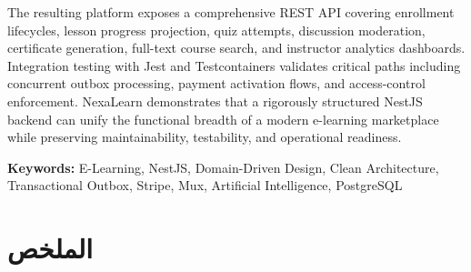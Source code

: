 The resulting platform exposes a comprehensive REST API covering enrollment lifecycles, lesson progress projection, quiz attempts, discussion moderation, certificate generation, full-text course search, and instructor analytics dashboards. Integration testing with Jest and Testcontainers validates critical paths including concurrent outbox processing, payment activation flows, and access-control enforcement. NexaLearn demonstrates that a rigorously structured NestJS backend can unify the functional breadth of a modern e-learning marketplace while preserving maintainability, testability, and operational readiness.

\textbf{Keywords:} E-Learning, NestJS, Domain-Driven Design, Clean Architecture, Transactional Outbox, Stripe, Mux, Artificial Intelligence, PostgreSQL

\clearpage

\section*{\texorpdfstring{\textarabic{الملخص}}{Abstract (Arabic)}}
{}

